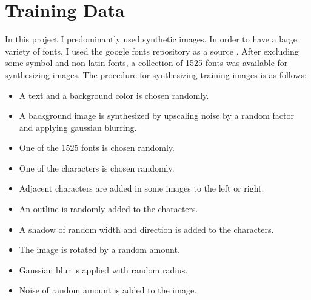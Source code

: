 \documentclass[11pt]{article}
\begin{document}
\section{Training Data}
In this project I predominantly used synthetic images. In order to have a large variety of fonts,
I used the google fonts repository as a source \cite{googlefo53:online}. After excluding some
symbol and non-latin fonts, a collection of 1525 fonts was available for synthesizing images.
The procedure for synthesizing training images is as follows:
\begin{itemize}
  \itemsep0em
  \item A text and a background color is chosen randomly.
  \item A background image is synthesized by upscaling noise by a random factor and applying gaussian blurring.
  \item One of the 1525 fonts is chosen randomly.
  \item One of the characters is chosen randomly.
  \item Adjacent characters are added in some images to the left or right.
  \item An outline is randomly added to the characters.
  \item A shadow of random width and direction is added to the characters.
  \item The image is rotated by a random amount.
  \item Gaussian blur is applied with random radius.
  \item Noise of random amount is added to the image.
\end{itemize}
\end{document}
